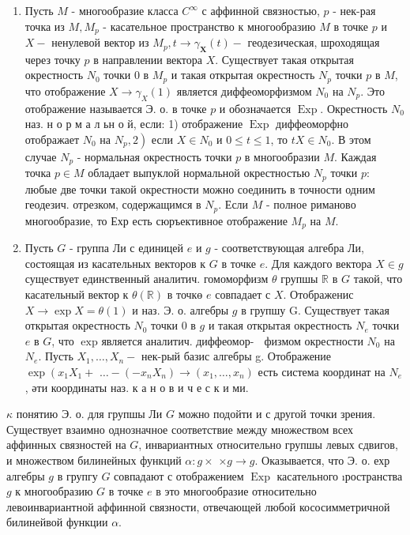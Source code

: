 \documentclass[10pt]{article}
\begin{document}
\begin{enumerate}

  \item Пусть $M$ - многообразие класса $C^{\infty}$ с аффинной связностью, $p$ - нек-рая точка из $M, M_{p}$ - касательное пространство к многообразию $M$ в точке $p$ и $X-$ ненулевой вектор из $M_{p}, t \rightarrow \gamma_{\boldsymbol{X}}(t)-$ геодезическая, шроходящая через точку $p$ в направлении вектора $X$. Существует такая открытая окрестность $N_{0}$ точки 0 в $M_{p}$ и такая открытая окрестность $N_{p}$ точки $p$ в $M$, что отображение $X \rightarrow \gamma_{X}(1)$ является диффеоморфизмом $N_{0}$ на $N_{p}$. Это отображение называется Э. о. в точке $p$ и обозначается $\operatorname{Exp}$. Окрестность $N_{0}$ наз. н о р м а л ьн о й, если: 1) отображение $\operatorname{Exp}$ диффеоморфно отображает $N_{0}$ на $\left.N_{p}, 2\right)$ если $X \in N_{0}$ и $0 \leqslant t \leqslant 1$, то $t X \in N_{0}$. В этом случае $N_{p}$ - нормальная окрестность точки $p$ в многообразии $M$. Каждая точка $p \in M$ обладает выпуклой нормальной окрестностью $N_{p}$ точки $p:$ любые две точки такой окрестности можно соединить в точности одним геодезич. отрезком, содержащимся в $N_{p}$. Если $M$ - полное риманово многообразие, то Ехр есть сюръективное отображение $M_{p}$ на $M$.



  \item Пусть $G$ - группа Ли с единицей $e$ и $g$ - соответствующая алгебра Ли, состоящая из касательных векторов к $G$ в точке $e$. Для каждого вектора $X \in g$ существует единственный аналитич. гомоморфизм $\theta$ групшы $\mathbb{R}$ в $G$ такой, что касательный вектор к $\theta(\mathbb{R})$ в точкө $e$ совпадает с $X$. Отображенис $X \rightarrow \exp X=\theta(1)$ и наз. Э. о. алгебры $g$ в групшу G. Существует такая открытая окрестность $N_{0}$ точки 0 в $g$ и такая открытая окрестность $N_{e}$ точки $e$ в $G$, что $\operatorname{exp~является~аналитич.~диффеомор-~}$ физмом окрестности $N_{0}$ на $N_{e}$. Пусть $X_{1}, \ldots, X_{n}-$ нек-рый базис алгебры g. Отображение $\exp \left(x_{1} X_{1}+\right.$ $\ldots-\left(-x_{n} X_{n}\right) \rightarrow\left(x_{1}, \ldots, x_{n}\right)$ есть система координат на $N_{e}$, әти координаты наз. к а н о в и ч е с к и ми.



\end{enumerate}



$\kappa$ понятию Э. о. для групшы Ли $G$ можно подойти и с другой точки зрения. Существует взаимно однозначное соответствие между множеством всех аффинных связностей на $G$, инвариантных относительно групшы левых сдвигов, и множеством билинейных функций $\alpha: g \times$ $\times g \rightarrow g$. Оказывается, что Э. о. ехр алгебры $g$ в групгу $G$ совпадают с отображением $\operatorname{Exp}$ касательного ıространства $g$ к многообразию $G$ в точке $e$ в это многообразие относительно левоинвариантной аффинной связности, отвечающей любой кососимметричной билинейвой функции $\alpha$.
\end{document}
